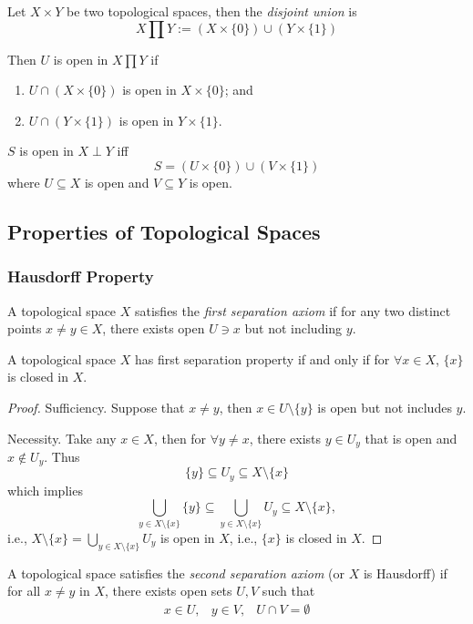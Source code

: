 \begin{definition}
Let $X\times Y$ be two topological spaces, then the \emph{disjoint union} is
\[
\displaystyle
X\prod Y:=(X\times\{0\})\cup(Y\times\{1\})
\]
\end{definition}
Then $U$ is open in $X\prod Y$ if
\begin{enumerate}
\item
$U\cap(X\times\{0\})$ is open in $X\times\{0\}$; and
\item
$U\cap(Y\times\{1\})$ is open in $Y\times\{1\}$.
\end{enumerate}

$S$ is open in $X\perp Y$ iff 
\[
S=(U\times\{0\})\cup(V\times\{1\})
\]
where $U\subseteq X$ is open and $V\subseteq Y$ is open.

\subsection{Properties of Topological Spaces}
\subsubsection{Hausdorff Property}
\begin{definition}
A topological space $X$ satisfies the \emph{first separation axiom} if for any two distinct points $x\ne y\in X$, there exists open $U\ni x$ but not including $y$.
\end{definition}

\begin{proposition}
A topological space $X$ has first separation property if and only if for $\forall x\in X$, $\{x\}$ is closed in $X$.
\end{proposition}
\begin{proof}
Sufficiency.
Suppose that $x\ne y$, then $x\in U\setminus\{y\}$ is open but not includes $y$.

Necessity.
Take any $x\in X$, then for $\forall y\ne x$, there exists $y\in U_y$ that is open and $x\notin U_y$. Thus 
\[
\{y\}\subseteq U_y\subseteq X\setminus\{x\}
\]
which implies
\[
\bigcup_{y\in X\setminus\{x\}}\{y\}\subseteq
\bigcup_{y\in X\setminus\{x\}}U_y\subseteq
X\setminus\{x\},
\]
i.e., $X\setminus\{x\}=\bigcup_{y\in X\setminus\{x\}}U_y$ is open in $X$, i.e., $\{x\}$ is closed in $X.$
\end{proof}

\begin{definition}
A topological space satisfies the \emph{second separation axiom} (or $X$ is Hausdorff) if for all $x\ne y$ in $X$, there exists open sets $U,V$ such that
\[
\begin{array}{lll}
x\in U,
&
y\in V,
&
U\cap V=\emptyset
\end{array}
\]
\end{definition}

